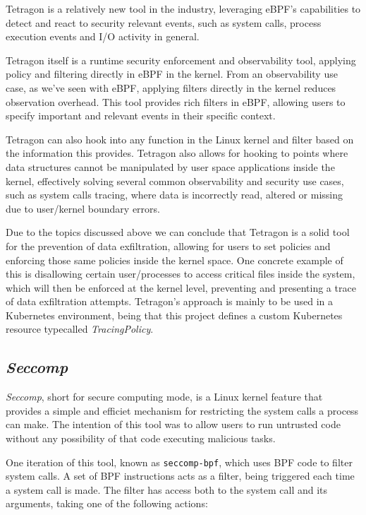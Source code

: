 Tetragon is a relatively new tool in the industry, leveraging eBPF's capabilities to detect and react to security relevant events, such as system calls, process execution events and I/O activity in general. 

Tetragon itself is a runtime security enforcement and observability tool, applying policy and filtering directly in eBPF in the kernel. From an observability use case, as we've seen with eBPF, applying filters directly in the kernel reduces observation overhead. This tool provides rich filters in eBPF, allowing users to specify important and relevant events in their specific context. 

Tetragon can also hook into any function in the Linux kernel and filter based on the information this provides. Tetragon also allows for hooking to points where data structures cannot be manipulated by user space applications inside the kernel, effectively solving several common observability and security use cases, such as system calls tracing, where data is incorrectly read, altered or missing due to user/kernel boundary errors. 

Due to the topics discussed above we can conclude that Tetragon is a solid tool for the prevention of data exfiltration, allowing for users to set policies and enforcing those same policies inside the kernel space. One concrete example of this is disallowing certain user/processes to access critical files inside the system, which will then be enforced at the kernel level, preventing and presenting a trace of data exfiltration attempts. Tetragon's approach is mainly to be used in a Kubernetes environment, being that this project defines a custom Kubernetes resource typecalled \textit{TracingPolicy}. 

\subsection{\textit{Seccomp}}

\textit{Seccomp}, short for secure computing mode, is a Linux kernel feature that provides a simple and efficiet mechanism for restricting the system calls a process can make. The intention of this tool was to allow users to run untrusted code without any possibility of that code executing malicious tasks. 

One iteration of this tool, known as \texttt{seccomp-bpf}, which uses BPF code to filter system calls. A set of BPF instructions acts as a filter, being triggered each time a system call is made. The filter has access both to the system call and its arguments, taking one of the following actions: 

